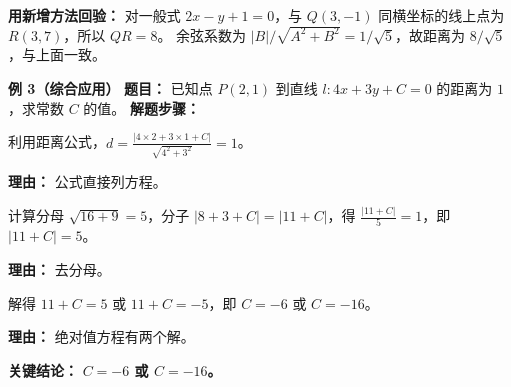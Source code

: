 \begin{examplebox}
\par\textbf{用新增方法回验：} 对一般式 $2x-y+1=0$，与 $Q(3,-1)$ 同横坐标的线上点为 $R(3,7)$，所以 $QR=8$。
余弦系数为 $|B|/\sqrt{A^2+B^2}=1/\sqrt5$，故距离为 $8/\sqrt5$，与上面一致。


	\medskip
	\textbf{\textcolor{CExample}{例 3（综合应用）}}
	\textbf{\textcolor{CExample}{题目：}}
	已知点 $P(2,1)$ 到直线 $l: 4x+3y+C=0$ 的距离为 $1$，求常数 $C$ 的值。
	\textbf{\textcolor{CExample}{解题步骤：}}
	\begin{description}[style=nextline, leftmargin=2.8em, labelsep=0.5em, itemsep=0.45em]
		\item[\textbf{第一步（建立方程）：}]
			利用距离公式，$d = \frac{|4\times2+3\times1+C|}{\sqrt{4^2+3^2}} = 1$。
			\par\textbf{理由：} 公式直接列方程。
		\item[\textbf{第二步（化简方程）：}]
			计算分母 $\sqrt{16+9}=5$，分子 $|8+3+C| = |11+C|$，得 $\frac{|11+C|}{5}=1$，即 $|11+C| = 5$。
			\par\textbf{理由：} 去分母。
		\item[\textbf{第三步（解绝对值方程）：}]
			解得 $11+C = 5$ 或 $11+C = -5$，即 $C = -6$ 或 $C = -16$。
			\par\textbf{理由：} 绝对值方程有两个解。
	\end{description}
	\textbf{\textcolor{CExample}{关键结论：}}
	\textbf{$C = -6$ 或 $C = -16$。}
\end{examplebox}
